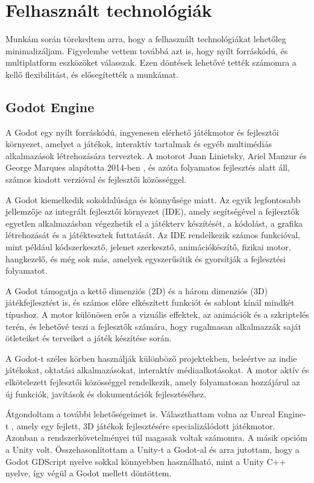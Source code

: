 \chapter{Felhasznált technológiák}

\thispagestyle{fancy}
\pagestyle{fancy}

Munkám során törekedtem arra, hogy a felhasznált technológiákat lehetőleg minimalizáljam. 
Figyelembe vettem továbbá azt is, hogy nyílt forráskódú, és multiplatform eszközöket válasszak. Ezen döntések lehetővé tették számomra a kellő flexibilitást, és elősegítették a munkámat.
\section{Godot Engine}
A Godot \cite{Introduc48:online} egy nyílt forráskódú, ingyenesen elérhető játékmotor és fejlesztői környezet, amelyet a játékok, interaktív tartalmak és egyéb multimédiás alkalmazások létrehozására terveztek. A motorot Juan Linietsky, Ariel Manzur és George Marques alapította 2014-ben \cite{TheEvolu53:online}, és azóta folyamatos fejlesztés alatt áll, számos kiadott verzióval és fejlesztői közösséggel.

A Godot kiemelkedik sokoldalúsága és könnyűsége miatt. Az egyik legfontosabb jellemzője az integrált fejlesztői környezet (IDE), amely segítségével a fejlesztők egyetlen alkalmazásban végezhetik el a játékterv készítését, a kódolást, a grafika létrehozását és a játéktesztek futtatását. Az IDE rendelkezik számos funkcióval, mint például kódszerkesztő, jelenet szerkesztő, animációkészítő, fizikai motor, hangkezelő, és még sok más, amelyek egyszerűsítik és gyorsítják a fejlesztési folyamatot.

A Godot támogatja a kettő dimenziós (2D) és a három dimenziós (3D) játékfejlesztést is, és számos előre elkészített funkciót és sablont kínál mindkét típushoz. A motor különösen erős a vizuális effektek, az animációk és a szkriptelés terén, és lehetővé teszi a fejlesztők számára, hogy rugalmasan alkalmazzák saját ötleteiket és terveiket a játék készítése során.
 
A Godot-t széles körben használják különböző projektekben, beleértve az indie játékokat, oktatási alkalmazásokat, interaktív médiaalkotásokat. A motor aktív és elkötelezett fejlesztői közösséggel rendelkezik, amely folyamatosan hozzájárul az új funkciók, javítások és dokumentációk fejlesztéséhez.

Átgondoltam a további lehetőségeimet is.
Választhattam volna az Unreal Engine-t \cite{unrealengine}, amely egy fejlett, 3D játékok fejlesztésére specializálódott játékmotor. 
Azonban a rendszerkövetelményei túl magasak voltak számomra. A másik opcióm a Unity \cite{UnityRea46:online} volt.
Összehasonlítottam a Unity-t  a Godot-al és arra jutottam, hogy a Godot GDScript nyelve sokkal könnyebben használható, mint a Unity C++ nyelve, így végül a Godot mellett döntöttem. 

